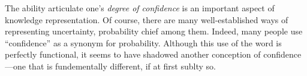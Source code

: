 \def\stmt{$A$}


The ability articulate one's \emph{degree of confidence} is an important aspect of knowledge representation.
Of course, there are many well-established ways of representing uncertainty,
	probability chief among them.
Indeed, many people use ``confidence'' as a synonym for probability.
Although this use of the word is perfectly functional, it seems to have shadowed another conception of confidence---one that is fundementally different, if at first sublty so.






